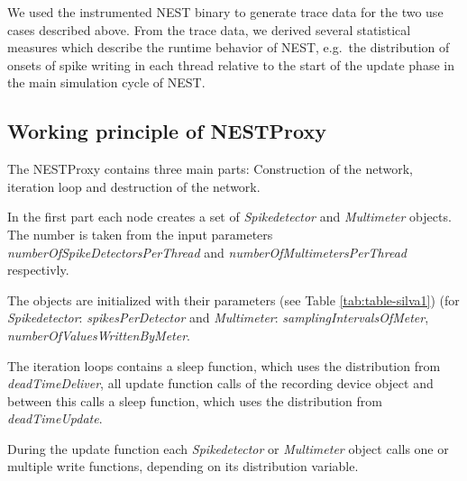 \documentclass[]{YIC2015}
\begin{document}
We used the instrumented NEST binary to generate trace data for the
two use cases described above. From the trace data, we derived several
statistical measures which describe the runtime behavior of NEST,
e.g.~the distribution of onsets of spike writing in each thread
relative to the start of the update phase in the main simulation cycle
of NEST.

\subsection{Working principle of NESTProxy}

The NESTProxy contains three main parts: Construction of the network,
iteration loop and destruction of the network.

In the first part each node creates a set of \emph{Spikedetector} and
\emph{Multimeter} objects.  The number is taken from the input
parameters \emph{numberOfSpikeDetectorsPerThread} and
\emph{numberOfMultimetersPerThread} respectivly.

The objects are initialized with their parameters (see Table
\ref{tab:table-silva1}) (for \emph{Spikedetector}:
\emph{spikesPerDetector} and \emph{Multimeter}:
\emph{samplingIntervalsOfMeter}, \emph{numberOfValuesWrittenByMeter}.

The iteration loops contains a sleep function, which uses the
distribution from \emph{deadTimeDeliver}, all update function calls of
the recording device object and between this calls a sleep function,
which uses the distribution from \emph{deadTimeUpdate}.

During the update function each \emph{Spikedetector} or
\emph{Multimeter} object calls one or multiple write functions,
depending on its distribution variable.
\end{document}
